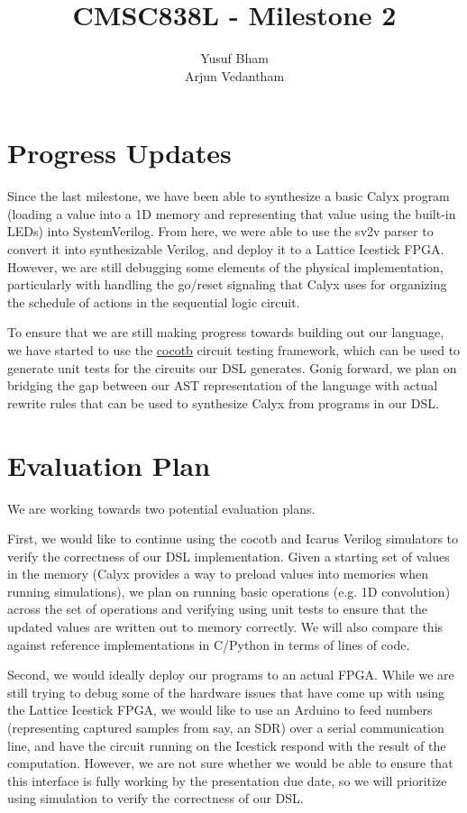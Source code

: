 \documentclass[11pt]{article} %
\title{CMSC838L - Milestone 2}
\author{Yusuf Bham \\ Arjun Vedantham}
\begin{document}
\maketitle

\section{Progress Updates}

Since the last milestone, we have been able to synthesize a basic Calyx program (loading a value into a 1D memory and representing that value using the built-in LEDs) into SystemVerilog. From here, we were able to use the sv2v parser to convert it into synthesizable Verilog, and deploy it to a Lattice Icestick FPGA. However, we are still debugging some elements of the physical implementation, particularly with handling the go/reset signaling that Calyx uses for organizing the schedule of actions in the sequential logic circuit. 

To ensure that we are still making progress towards building out our language, we have started to use the \href{https://docs.cocotb.org/en/stable/index.html}{cocotb} circuit testing framework, which can be used to generate unit tests for the circuits our DSL generates. Gonig forward, we plan on bridging the gap between our AST representation of the language with actual rewrite rules that can be used to synthesize Calyx from programs in our DSL. 

\section{Evaluation Plan}
We are working towards two potential evaluation plans. 

First, we would like to continue using the cocotb and Icarus Verilog simulators to verify the correctness of our DSL implementation. Given a starting set of values in the memory (Calyx provides a way to preload values into memories when running simulations), we plan on running basic operations (e.g. 1D convolution) across the set of operations and verifying using unit tests to ensure that the updated values are written out to memory correctly. We will also compare this against reference implementations in C/Python in terms of lines of code. 

Second, we would ideally deploy our programs to an actual FPGA. While we are still trying to debug some of the hardware issues that have come up with using the Lattice Icestick FPGA, we would like to use an Arduino to feed numbers (representing captured samples from say, an SDR) over a serial communication line, and have the circuit running on the Icestick respond with the result of the computation. However, we are not sure whether we would be able to ensure that this interface is fully working by the presentation due date, so we will prioritize using simulation to verify the correctness of our DSL. 
\end{document}
